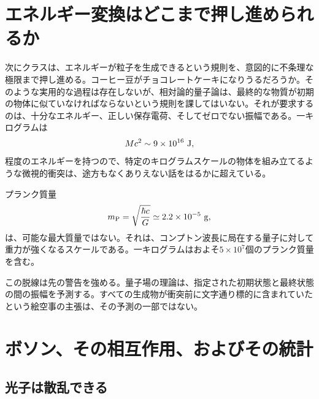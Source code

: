 \section{エネルギー変換はどこまで押し進められるか}

次にクラスは、エネルギーが粒子を生成できるという規則を、意図的に不条理な極限まで押し進める。コーヒー豆がチョコレートケーキになりうるだろうか。そのような実用的な過程は存在しないが、相対論的量子論は、最終的な物質が初期の物体に似ていなければならないという規則を課してはいない。それが要求するのは、十分なエネルギー、正しい保存電荷、そしてゼロでない振幅である。一キログラムは
\begin{equation}
  Mc^2\sim9\times10^{16}\ {\rm J},
\end{equation}
程度のエネルギーを持つので、特定のキログラムスケールの物体を組み立てるような微視的衝突は、途方もなくありえない話をはるかに超えている。

プランク質量
\begin{equation}
  m_{\rm P}=\sqrt{\frac{\hbar c}{G}}
  \simeq2.2\times10^{-5}\ {\rm g},
\end{equation}
は、可能な最大質量ではない。それは、コンプトン波長に局在する量子に対して重力が強くなるスケールである。一キログラムはおよそ\(5\times10^7\)個のプランク質量を含む。

\begin{classroomqa}
\end{classroomqa}

この脱線は先の警告を強める。量子場の理論は、指定された初期状態と最終状態の間の振幅を予測する。すべての生成物が衝突前に文字通り標的に含まれていたという絵空事の主張は、その予測の一部ではない。

\section{ボソン、その相互作用、およびその統計}

\subsection{光子は散乱できる}

